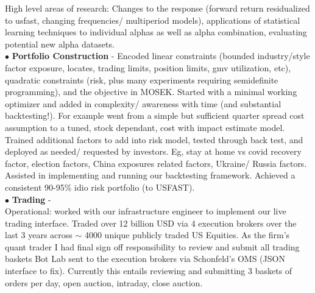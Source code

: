 \documentclass[a4paper,20pt]{article}
\begin{document}
{                 High level areas of research: Changes to the response (forward return residualized to usfast, changing frequencies/ multiperiod models), applications of statistical learning techniques to
                 individual alphas as well as alpha combination, evaluating potential new alpha datasets.
                 \\$\bullet$ \textbf{Portfolio Construction} - Encoded linear constraints (bounded industry/style factor exposure, locates, trading limits, position limits, gmv utilization, etc), quadratic
                 constraints (risk, plus many experiments requiring semidefinite programming), and the objective in MOSEK. Started with a minimal working optimizer and added in complexity/ awareness with time (and
                 substantial backtesting!). For example went from a simple but sufficient quarter spread cost
                 assumption to a tuned, stock dependant, cost with impact estimate model. Trained additional factors to add into risk model, tested through back test, and deployed as needed/ requested by
                 investors. Eg, stay at home vs covid recovery factor, election factors, China exposures related factors, Ukraine/ Russia factors. Assisted in implementing and running our backtesting framework.
                 Achieved a consistent 90-95\% idio risk portfolio (to USFAST).
                 \\$\bullet$ \textbf{Trading} -\\
                 Operational: worked with our infrastructure engineer to implement our live trading interface.
                 Traded over 12 billion USD via 4 execution brokers over the last 3 years across $\sim$ 4000 unique publicly traded US Equities. As the firm's
                 quant trader I had final sign off responsibility to review and submit all trading baskets Bot Lab sent to the execution brokers via Schonfeld's OMS (JSON interface to fix).
                 Currently this entails reviewing and submitting 3 baskets of orders per day, open auction, intraday, close auction.

}
\end{document}
